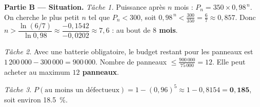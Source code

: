 \smallskip
\noindent\textbf{Partie B — Situation.}
\emph{Tâche 1.} Puissance après $n$ mois : $P_n=350\times0{,}98^{\,n}$. On cherche le plus petit
$n$ tel que $P_n<300$, soit $0{,}98^{\,n}<\frac{300}{350}=\frac67\approx0{,}857$. Donc
$n>\dfrac{\ln(6/7)}{\ln0{,}98}\approx\dfrac{-0{,}1542}{-0{,}0202}\approx7{,}6$ : au bout de
\textbf{$8$ mois}.

\emph{Tâche 2.} Avec une batterie obligatoire, le budget restant pour les panneaux est
$1\,200\,000-300\,000=900\,000$. Nombre de panneaux $\le\frac{900\,000}{75\,000}=12$. Elle peut
acheter au maximum \textbf{$12$ panneaux}.

\emph{Tâche 3.} $P(\text{au moins un défectueux})=1-(0{,}96)^5\approx1-0{,}8154=\mathbf{0{,}185}$,
soit environ \SI{18,5}{\percent}.
